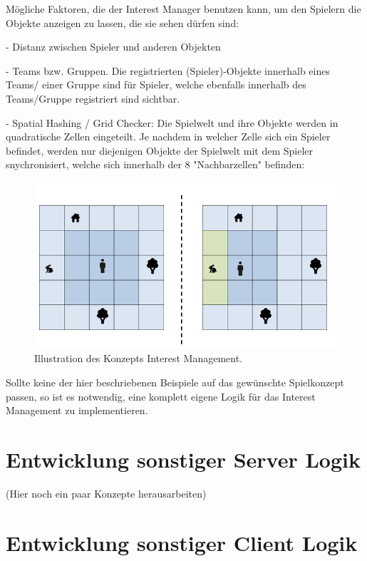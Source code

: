 Mögliche Faktoren, die der Interest Manager benutzen kann, um den Spielern die Objekte anzeigen zu lassen, die sie sehen dürfen sind:

- Distanz zwischen Spieler und anderen Objekten

- Teams bzw. Gruppen. Die registrierten (Spieler)-Objekte innerhalb eines Teams/ einer Gruppe sind für Spieler, welche ebenfalls innerhalb des Teams/Gruppe registriert sind sichtbar.

- Spatial Hashing / Grid Checker: Die Spielwelt und ihre Objekte werden in quadratische Zellen eingeteilt. Je nachdem in welcher Zelle sich ein Spieler befindet, werden nur diejenigen Objekte der Spielwelt mit dem Spieler snychronisiert, welche sich innerhalb der 8 "Nachbarzellen" befinden:

\begin{figure}
	\centering
	\includegraphics[width=150mm]{images/interest_management.png}
	\caption[Interest Management]{Illustration des Konzepts Interest Management. \cite{JeromeRenaux.2017} }
	\label{pic:interest_management}
\end{figure}

Sollte keine der hier beschriebenen Beispiele auf das gewünschte Spielkonzept passen, so ist es notwendig, eine komplett eigene Logik für das Interest Management zu implementieren. 

\section{Entwicklung sonstiger Server Logik}

(Hier noch ein paar Konzepte herausarbeiten)

\section{Entwicklung sonstiger Client Logik}

